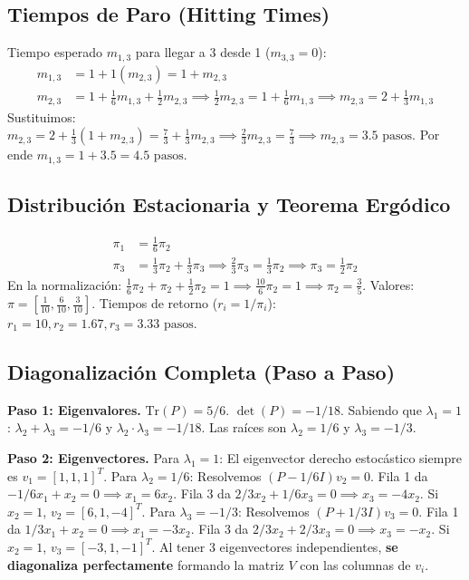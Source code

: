 \documentclass[12pt, a4paper]{article}
\begin{document}
\subsection{Tiempos de Paro (Hitting Times)}
Tiempo esperado $m_{1,3}$ para llegar a 3 desde 1 ($m_{3,3}=0$):
\begin{align}
    m_{1,3} &= 1 + 1(m_{2,3}) = 1 + m_{2,3} \\
    m_{2,3} &= 1 + \frac{1}{6}m_{1,3} + \frac{1}{2}m_{2,3} \implies \frac{1}{2}m_{2,3} = 1 + \frac{1}{6}m_{1,3} \implies m_{2,3} = 2 + \frac{1}{3}m_{1,3}
\end{align}
Sustituimos: $m_{2,3} = 2 + \frac{1}{3}(1+m_{2,3}) = \frac{7}{3} + \frac{1}{3}m_{2,3} \implies \frac{2}{3}m_{2,3} = \frac{7}{3} \implies m_{2,3} = 3.5 \text{ pasos.}$
Por ende $m_{1,3} = 1 + 3.5 = 4.5 \text{ pasos}$.

\subsection{Distribución Estacionaria y Teorema Ergódico}
\begin{align}
    \pi_1 &= \frac{1}{6}\pi_2 \\
    \pi_3 &= \frac{1}{3}\pi_2 + \frac{1}{3}\pi_3 \implies \frac{2}{3}\pi_3 = \frac{1}{3}\pi_2 \implies \pi_3 = \frac{1}{2}\pi_2
\end{align}
En la normalización: $\frac{1}{6}\pi_2 + \pi_2 + \frac{1}{2}\pi_2 = 1 \implies \frac{10}{6}\pi_2 = 1 \implies \pi_2 = \frac{3}{5}$.
Valores: $\pi = \left[ \frac{1}{10}, \frac{6}{10}, \frac{3}{10} \right]$.
Tiempos de retorno ($r_i=1/\pi_i$): $r_1=10, r_2=1.67, r_3=3.33 \text{ pasos}$.

\subsection{Diagonalización Completa (Paso a Paso)}
\textbf{Paso 1: Eigenvalores.} $\text{Tr}(P) = 5/6$. $\det(P) = -1/18$. Sabiendo que $\lambda_1 = 1$:
$\lambda_2 + \lambda_3 = -1/6$ y $\lambda_2 \cdot \lambda_3 = -1/18$. Las raíces son $\lambda_2 = 1/6$ y $\lambda_3 = -1/3$. 

\textbf{Paso 2: Eigenvectores.}
Para $\lambda_1 = 1$: El eigenvector derecho estocástico siempre es $v_1 = [1, 1, 1]^T$.
Para $\lambda_2 = 1/6$: Resolvemos $(P - 1/6I)v_2 = 0$. Fila 1 da $-1/6x_1 + x_2 = 0 \implies x_1 = 6x_2$. Fila 3 da $2/3x_2 + 1/6x_3 = 0 \implies x_3 = -4x_2$. Si $x_2=1$, $v_2 = [6, 1, -4]^T$.
Para $\lambda_3 = -1/3$: Resolvemos $(P + 1/3I)v_3 = 0$. Fila 1 da $1/3x_1 + x_2 = 0 \implies x_1 = -3x_2$. Fila 3 da $2/3x_2 + 2/3x_3 = 0 \implies x_3 = -x_2$. Si $x_2=1$, $v_3 = [-3, 1, -1]^T$.
Al tener 3 eigenvectores independientes, \textbf{se diagonaliza perfectamente} formando la matriz $V$ con las columnas de $v_i$.
\end{document}
